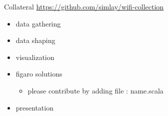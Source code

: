 \documentclass[11pt]{beamer}
\begin{document}
\begin{frame}{Collateral}
\href{https://github.com/simlay/wifi-collection}{https://github.com/simlay/wifi-collection}
\begin{itemize}
\item data gathering
\item data shaping
\item visualization
\item figaro solutions
\begin{itemize}
\item please contribute by adding file : name.scala
\end{itemize}
\item presentation
\end{itemize}

\end{frame}
\end{document}
